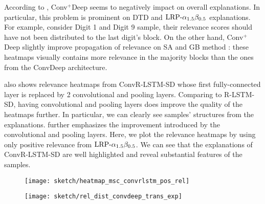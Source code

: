 According to \addfigure{\ref{fig:heatmap_msc_convtran_exp}}, Conv$^+$Deep seems to negatively impact on overall explanations. In particular, this problem is prominent on DTD and $\text{LRP-}\alpha_{1.5}\beta_{0.5}$ explanations. 
For example, consider Digit 1 and Digit 9 sample, their relevance scores should have not been distributed to the last digit's block. On the other hand, Conv$^+$Deep slightly improve propagation of relevance on SA and GB method : these heatmaps visually contains more relevance in the majority blocks than the ones from the ConvDeep architecture.

%
%

\addfigure{\ref{fig:heatmap_msc_convtran_exp}} also shows relevance heatmaps from ConvR-LSTM-SD whose first fully-connected layer is replaced by 2 convolutional and pooling layers. Comparing to R-LSTM-SD, having convolutional and pooling layers does improve  the quality of the heatmaps further. In particular, we can clearly see samples' structures from the explanations. \addfigure{\ref{fig:heatmap_msc_convrlstm_pos_rel}} further emphasizes the improvement introduced by the convolutional and pooling layers. Here, we plot the relevance heatmaps by using only positive relevance from $\text{LRP-}\alpha_{1.5}\beta_{0.5}$. We can see that the explanations of ConvR-LSTM-SD are well highlighted and reveal substantial  features of the samples.

 \begin{figure}[!htb]
\centering
\texttt{[image: sketch/heatmap\_msc\_convrlstm\_pos\_rel]}
\label{fig:heatmap_msc_convrlstm_pos_rel}
\end{figure}

 \begin{figure}[!htb]
\centering
\texttt{[image: sketch/rel\_dist\_convdeep\_trans\_exp]}
\label{fig:rel_dist_convdeep_trans_exp}
\end{figure}

